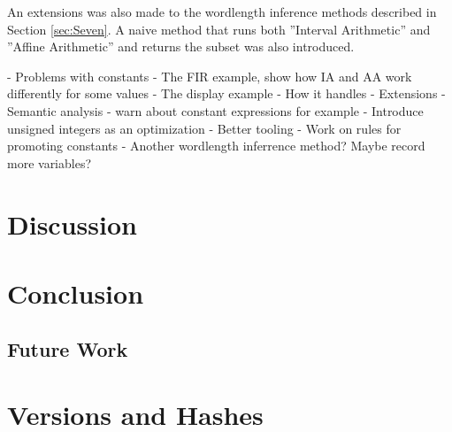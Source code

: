 \documentclass[msc,lith,english]{liuthesis}
\begin{document}
An extensions was also made to the wordlength inference methods described in Section \ref{sec:Seven}. A naive method that runs both ''Interval Arithmetic'' and ''Affine Arithmetic'' and returns the subset was also introduced.

 - Problems with constants
 - The FIR example, show how IA and AA work differently for some values
 - The display example
 - How it handles 
 - Extensions
    - Semantic analysis
        - warn about constant expressions for example
    - Introduce unsigned integers as an optimization
    - Better tooling
    - Work on rules for promoting constants
    - Another wordlength inferrence method? Maybe record more variables?

\chapter{Discussion}
\label{cha:Discussion}

\chapter{Conclusion}
\label{cha:Conclusion}

\section{Future Work}

\clearpage

\printbibliography

\appendix
\chapter{Versions and Hashes}
\label{app:VersionsAndGitHashes}
\end{document}
